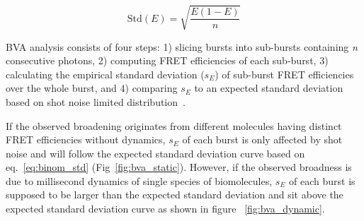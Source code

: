 \begin{equation}
\label{eq:binom_std}
\operatorname{Std(\textit{E})} = {\sqrt{\frac{E(1 - E)}{n}}}
\end{equation}

BVA analysis consists of four steps: 1) slicing bursts into sub-bursts containing \textit{n} consecutive photons, 2) computing FRET efficiencies of each sub-burst, 3) calculating the empirical standard deviation ($s_E$) of sub-burst FRET efficiencies over the whole burst, and 4) comparing $s_E$ to an expected standard deviation based on shot noise limited distribution~\cite{Torella_2011}. 

If the observed broadening originates from different molecules having distinct FRET efficiencies without dynamics, $s_E$ of each burst is only affected by shot noise and will follow the expected standard deviation curve based on eq.~\ref{eq:binom_std} (Fig~\ref{fig:bva_static}). However, if the observed broadness is due to millisecond dynamics of single species of biomolecules, $s_E$ of each burst is supposed to be larger than the expected standard deviation and sit above the expected standard deviation curve as shown in figure ~\ref{fig:bva_dynamic}.

